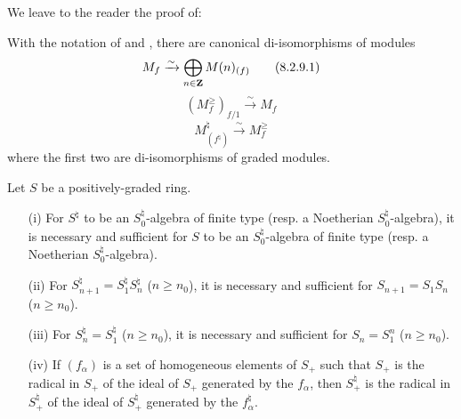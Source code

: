 We leave to the reader the proof of:
\begin{lemma}[8.2.9]
\label{2.8.2.9}
With the notation of  and , there are canonical di-isomorphisms of modules
\[
\label{eq:2.8.2.9.1}
  M_f \xrightarrow{\sim} \bigoplus_{n\in\mathbf{Z}} M(n)_{(f)}
\tag{8.2.9.1}
\]
\[
\label{eq:2.8.2.9.2}
  (M_f^\geq)_{f/1} \xrightarrow{\sim} M_f
\tag{8.2.9.2}
\]
\[
\label{eq:2.8.2.9.3}
  M_{(f^\natural)}^\natural \xrightarrow{\sim} M_f^\geq
\tag{8.2.9.3}
\]
where the first two are di-isomorphisms of graded modules.
\end{lemma}

\begin{lemma}[8.2.10]
\label{2.8.2.10}
Let $S$ be a positively-graded ring.
\begin{enumerate}
  \item[\rm{(i)}] For $S^\natural$ to be an $S_0^\natural$-algebra of finite type (resp. a Noetherian $S_0^\natural$-algebra), it is necessary and sufficient for $S$ to be an $S_0^\natural$-algebra of finite type (resp. a Noetherian $S_0^\natural$-algebra).
  \item[\rm{(ii)}] For $S_{n+1}^\natural = S_1^\natural S_n^\natural$ ($n\geq n_0$), it is necessary and sufficient for $S_{n+1}=S_1S_n$ ($n\geq n_0$).
  \item[\rm{(iii)}] For $S_n^\natural = S_1^\natural$ ($n\geq n_0$), it is necessary and sufficient for $S_n=S_1^n$ ($n\geq n_0$).
  \item[\rm{(iv)}] If $(f_\alpha)$ is a set of homogeneous elements of $S_+$ such that $S_+$ is the radical in $S_+$ of the ideal of $S_+$ generated by the $f_\alpha$, then $S_+^\natural$ is the radical in $S_+^\natural$ of the ideal of $S_+^\natural$ generated by the $f_\alpha^\natural$.
\end{enumerate}
\end{lemma}

